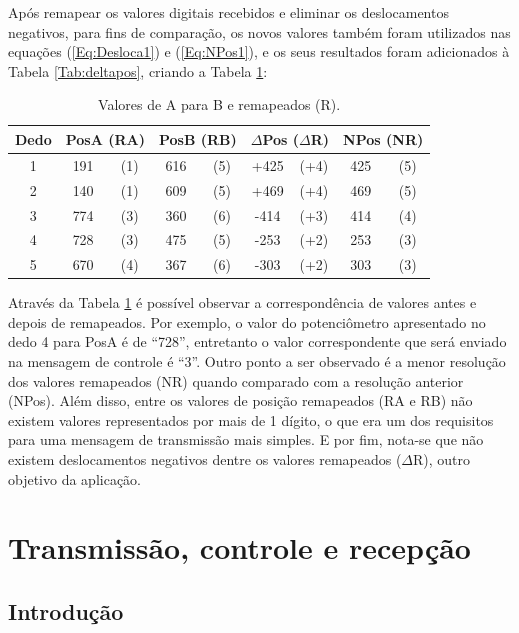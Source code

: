 \documentclass[
	12pt,				%
	openright,			%
	oneside,			%
	a4paper,			%
	english,			%
	brazil				%
	]{abntex2}
\begin{document}
	 Após remapear os valores digitais recebidos e eliminar os deslocamentos negativos, para fins de comparação, os novos valores também foram utilizados nas equações (\ref{Eq:Desloca1}) e (\ref{Eq:NPos1}), e os seus resultados foram adicionados à Tabela \ref{Tab:deltapos}, criando a Tabela \ref{Tab:deltaremap}:


	\begin{table}[H]
  	\centering
		\caption{Valores de A para B e remapeados (R).}
    \begin{tabular}{c|cc|cc|cc|cc}
      \midrule
			Dedo	&\multicolumn{2}{c}{PosA	(RA)} 	&\multicolumn{2}{c}{PosB (RB)}	&\multicolumn{2}{c}{$\Delta$Pos	($\Delta$R)}	&\multicolumn{2}{c}{NPos	(NR)}	\\
      \midrule
			1 		& 191 & (1)		& 616 & (5)		& 		+425 & (+4)		&			425	& (5)		\\
			2 		& 140 & (1)		& 609 & (5)		& 		+469 & (+4)		&			469 &	(5)		\\
			3 		& 774 & (3)		& 360 & (6)		& 		-414 & (+3)		&			414	& (4)		\\
			4 		& 728 & (3)		& 475 & (5)		& 		-253 & (+2)		&			253	& (3)		\\
			5 		& 670 & (4)		& 367 & (6)		& 		-303 & (+2)		&			303 &	(3)		\\      
      \midrule
    \end{tabular}
    \label{Tab:deltaremap}
	\end{table}
	
		Através da Tabela \ref{Tab:deltaremap} é possível observar a correspondência de valores antes e depois de remapeados. Por exemplo, o valor do potenciômetro apresentado no dedo 4 para PosA é de ``728'', entretanto o valor correspondente que será enviado na mensagem de controle é ``3''. Outro ponto a ser observado é a menor resolução dos valores remapeados (NR) quando comparado com a resolução anterior (NPos). Além disso, entre os valores de posição remapeados (RA e RB) não existem valores representados por mais de 1 dígito, o que era um dos requisitos para uma mensagem de transmissão mais simples. E por fim, nota-se que não existem deslocamentos negativos dentre os valores remapeados ($\Delta$R), outro objetivo da aplicação.

	
		\section{Transmissão, controle e recepção}

		\subsection{Introdução}
\end{document}
